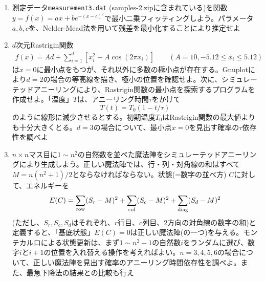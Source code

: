 \documentclass[11pt]{jarticle}
\begin{document}
\begin{enumerate}
\item 測定データ{\tt measurement3.dat} (samples-2.zipに含まれている)を関数$y=f(x)=ax+be^{−(x−c)^2}$で最小二乗フィッティングしよう。パラメータ$a, b, c$を、Nelder-Mead法を用いて残差を最小化することにより推定せよ
  \begin{center}
  \end{center}
  
\item $d$次元Rastrigin関数
  \begin{align*}
    f(x) = Ad+\sum_{i=1}^d [x_i^2 - A \cos (2 \pi x_i)] \qquad (A=10, -5.12 \le x_{i} \le 5.12)
  \end{align*}
  は$x=0$に最小点をもつが、それ以外に多数の極小点が存在する。Gnuplotにより$d=2$の場合の等高線を描き、極小の位置を確認せよ。次に、シミュレーテッドアニーリングにより、Rastrigin関数の最小点を探索するプログラムを作成せよ。「温度」$T$は、アニーリング時間$\tau$をかけて
  \[
  T(t) = T_0 (1 - t/\tau)
  \]
  のように線形に減少させるとする。初期温度$T_0$はRastrigin関数の最大値よりも十分大きくとる。$d=3$の場合について、最小点$x=0$を見出す確率の$\tau$依存性を調べよ

\item $n \times n$マス目に$1\sim n^2$の自然数を並べた魔法陣をシミュレーテッドアニーリングにより生成しよう。正しい魔法陣では、行・列・対角線の和はすべて$M = n(n^2+1)/2$とならなければならない。状態(=数字の並べ方) $C$に対して、エネルギーを
  \[
  E(C) = \sum_{\rm row} (S_r-M)^2 + \sum_{\rm col} (S_c-M)^2 + \sum_{\rm diag} (S_d-M)^2
  \]
  (ただし、$S_r, S_c, S_d$はそれぞれ、$r$行目、$c$列目、2方向の対角線の数字の和)と定義すると、「基底状態」$E(C)=0$は正しい魔法陣(の一つ)を与える。モンテカルロによる状態更新は、まず$1\sim n^2-1$の自然数$i$をランダムに選び、数字$i$と$i+1$の位置を入れ替える操作を考えればよい。$n=3,4,5,6$の場合について、正しい魔法陣を見出す確率のアニーリング時間依存性を調べよ。また、最急下降法の結果との比較も行え


\end{enumerate}
\end{document}
